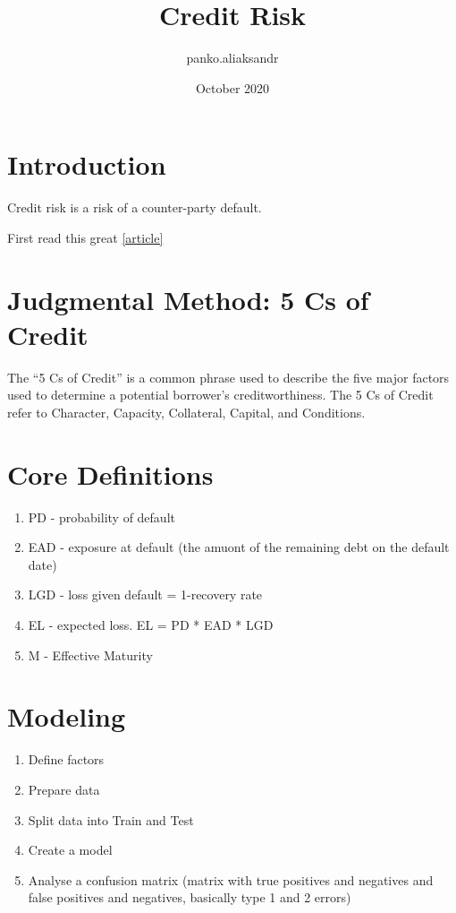 \documentclass{article}
\title{Credit Risk}
\author{panko.aliaksandr }
\date{October 2020}
\begin{document}
\maketitle
\tableofcontents

\section{Introduction}
Credit risk is a risk of a counter-party default.

First read this great 
\href{https://www.listendata.com/2019/08/credit-risk-modelling.html#Probability-of-Default-Modeling}{[article]}

\section{Judgmental Method: 5 Cs of Credit}
The “5 Cs of Credit” is a common phrase used to describe the five major factors used to determine a potential borrower’s creditworthiness.
The 5 Cs of Credit refer to Character, Capacity, Collateral, Capital, and Conditions.

\section{Core Definitions}
\begin{enumerate}
    \item PD - probability of default
    \item EAD - exposure at default (the amuont of the remaining debt on the default date)
    \item LGD - loss given default = 1-recovery rate
    \item EL - expected loss. EL = PD * EAD * LGD
    \item M - Effective Maturity 
\end{enumerate}

\section{Modeling}
\begin{enumerate}
    \item Define factors
    \item Prepare data 
    \item Split data into Train and Test
    \item Create a model
    \item Analyse a confusion matrix (matrix with true positives and negatives and false positives and negatives, basically type 1 and 2 errors)
\end{enumerate}
\end{document}
